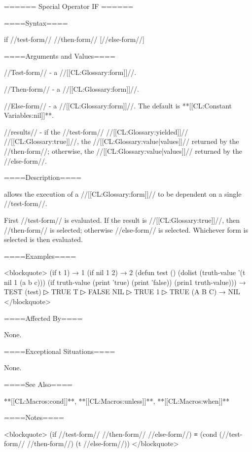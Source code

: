 ====== Special Operator IF ======

====Syntax====

\DefspecWithValues if {//test-form// //then-form// [//else-form//]} {}

====Arguments and Values====

//Test-form// - a //[[CL:Glossary:form]]//.

//Then-form// - a //[[CL:Glossary:form]]//.

//Else-form// - a //[[CL:Glossary:form]]//. The default is **[[CL:Constant Variables:nil]]**.

//results// - if the //test-form// //[[CL:Glossary:yielded]]// //[[CL:Glossary:true]]//, the //[[CL:Glossary:value|values]]// returned by the //then-form//; otherwise, the //[[CL:Glossary:value|values]]// returned by the //else-form//.

====Description====

 allows the execution of a //[[CL:Glossary:form]]// to be dependent on a single //test-form//.

First //test-form// is evaluated. If the result is //[[CL:Glossary:true]]//, then //then-form// is selected; otherwise //else-form// is selected. Whichever form is selected is then evaluated.

====Examples====

<blockquote> (if t 1) → 1 (if nil 1 2) → 2 (defun test () (dolist (truth-value '(t nil 1 (a b c))) (if truth-value (print 'true) (print 'false)) (prin1 truth-value))) → TEST (test)
▷ TRUE T
▷ FALSE NIL
▷ TRUE 1
▷ TRUE (A B C) → NIL </blockquote>

====Affected By====

None.

====Exceptional Situations====

None.

====See Also====

**[[CL:Macros:cond]]**, **[[CL:Macros:unless]]**, **[[CL:Macros:when]]**

====Notes====

<blockquote> (if //test-form// //then-form// //else-form//) ≡ (cond (//test-form// //then-form//) (t //else-form//)) </blockquote>

